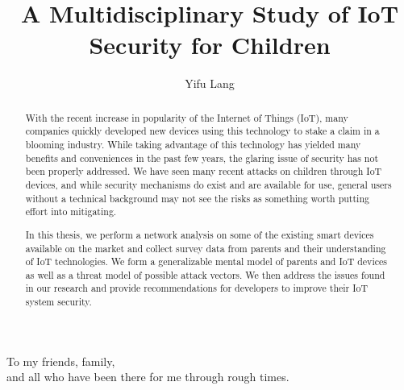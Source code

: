 \documentclass[12pt]{ucthesis}
\begin{document}

\title{A Multidisciplinary Study of IoT Security for Children}
\author{Yifu Lang}
\deanlinethree{}

\begin{frontmatter}

\maketitle
\copyrightpage

\tableofcontents
\listoffigures
\listoftables

\begin{abstract}
With the recent increase in popularity of the Internet of Things (IoT), many companies quickly developed new devices using this technology to stake a claim in a blooming industry. While taking advantage of this technology has yielded many benefits and conveniences in the past few years, the glaring issue of security has not been properly addressed. We have seen many recent attacks on children through IoT devices, and while security mechanisms do exist and are available for use, general users without a technical background may not see the risks as something worth putting effort into mitigating. 

In this thesis, we perform a network analysis on some of the existing smart devices available on the market and collect survey data from parents and their understanding of IoT technologies. We form a generalizable mental model of parents and IoT devices as well as a threat model of possible attack vectors. We then address the issues found in our research and provide recommendations for developers to improve their IoT system security. 
\end{abstract}

\begin{dedication}
\null\vfil
{\large
\begin{center}
To my friends, family,\\\vspace{12pt}
and all who have been there for me through rough times.\\\vspace{12pt}
\end{center}}
\vfil\null
\end{dedication}


\end{frontmatter}
\end{document}

